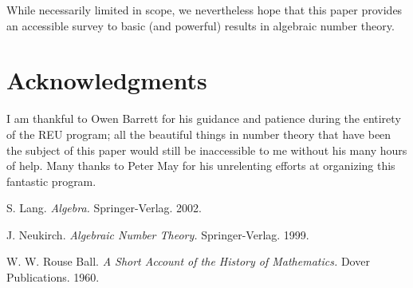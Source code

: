 \documentclass[psamsfonts]{amsart}
\theoremstyle{definition}
\theoremstyle{remark}
\numberwithin{equation}{section}
\begin{document}
While necessarily limited in scope, we nevertheless hope that this paper provides an accessible survey to basic (and powerful) results in algebraic number theory.











\section*{Acknowledgments}
I am thankful to Owen Barrett for his guidance and patience during the entirety of the REU program; all the beautiful things in number theory that have been the subject of this paper would still be inaccessible to me without his many hours of help. Many thanks to Peter May for his unrelenting efforts at organizing this fantastic program.

\begin{thebibliography}{9}

S. Lang.
\emph{Algebra.}
Springer-Verlag. 2002.

J. Neukirch.
\emph{Algebraic Number Theory.}
Springer-Verlag. 1999.

W. W. Rouse Ball.
\emph{A Short Account of the History of Mathematics.}
Dover Publications. 1960.

\end{thebibliography}
\end{document}

